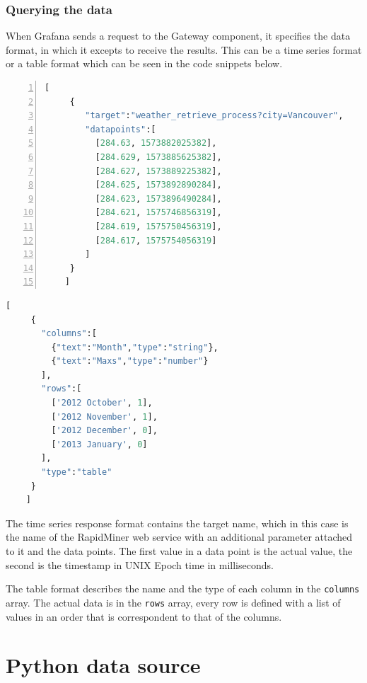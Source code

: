 \subsubsection{Querying the data}\label{impl-qurying}
When Grafana sends a request to the Gateway component, it specifies the data format, in which it excepts to receive the results. This can be a time series format or a table format which can be seen in the code snippets below.

\begin{minipage}[b]{0.45\linewidth}
	\centering
	\begin{lstlisting}[language=Python, frame=single, numbers=left, mathescape,%
	caption={Time series format}, label=lst:timeseries-format]
	[
	 {
	    "target":"weather_retrieve_process?city=Vancouver",
	    "datapoints":[
	      [284.63, 1573882025382],
	      [284.629, 1573885625382],
	      [284.627, 1573889225382],
	      [284.625, 1573892890284],
	      [284.623, 1573896490284],
	      [284.621, 1575746856319],
	      [284.619, 1575750456319],
	      [284.617, 1575754056319]
	    ]
	 }
	]
	\end{lstlisting}
\end{minipage}
\hspace{0.5cm}
\begin{minipage}[b]{0.45\linewidth}
	\centering
	\begin{lstlisting}[language=Python, frame=single, mathescape,%
	caption={Table format}, label=lst:table-format]
	[
	 {
	   "columns":[
	     {"text":"Month","type":"string"},
	     {"text":"Maxs","type":"number"}
	   ],
	   "rows":[
	     ['2012 October', 1],
	     ['2012 November', 1],
	     ['2012 December', 0],
	     ['2013 January', 0]
	   ],
	   "type":"table"
	 }
	]
	\end{lstlisting}
\end{minipage}

The time series response format contains the target name, which in this case is the name of the RapidMiner web service with an additional parameter attached to it and the data points. The first value in a data point is the actual value, the second is the timestamp in UNIX Epoch time in milliseconds.

The table format describes the name and the type of each column in the \texttt{columns} array. The actual data is in the \texttt{rows} array, every row is defined with a list of values in an order that is correspondent to that of the columns.

\section{Python data source}

